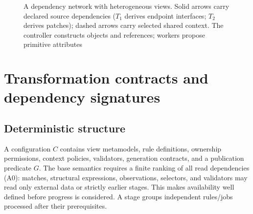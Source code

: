 \documentclass[pdflatex,sn-mathphys-num]{sn-jnl}
\theoremstyle{thmstyleone}
\theoremstyle{thmstylethree}
\theoremstyle{thmstyletwo}
\begin{document}
\begin{figure}[tb]
\centering
{}
\caption{A dependency network with heterogeneous views. Solid arrows carry declared source dependencies ($T_1$ derives endpoint interfaces; $T_2$ derives patches); dashed arrows carry selected shared context. The controller constructs objects and references; workers propose primitive attributes}\label{fig:network}
\end{figure}

\section{Transformation contracts and dependency signatures}\label{sec:contracts}
\subsection{Deterministic structure}
A configuration $C$ contains view metamodels, rule definitions, ownership permissions, context policies, validators, generation contracts, and a publication predicate $G$. The base semantics requires a finite ranking of all read dependencies (A0): matches, structural expressions, observations, selectors, and validators may read only external data or strictly earlier stages. This makes availability well defined before progress is considered. A stage groups independent rules/jobs processed after their prerequisites.
\end{document}
